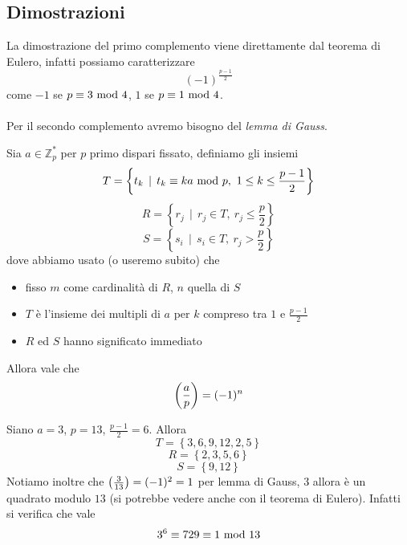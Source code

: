 \subsection{Dimostrazioni}
\begin{osservazione}
	La dimostrazione del primo complemento viene direttamente dal teorema di Eulero, infatti possiamo caratterizzare 
	\begin{equation*}
	(-1)^{\frac{p-1}{2}}
	\end{equation*}
	come $-1$ se $p\equiv3\ \mathrm{mod}\ 4$, $1$ se $p\equiv1\ \mathrm{mod}\ 4$. \\ \\ Per il secondo complemento avremo bisogno del \textit{lemma di Gauss}.
\end{osservazione}
\begin{teorema}
	Sia $a\in\mathbb{Z}_p^*$ per $p$ primo dispari fissato, definiamo gli insiemi
	\begin{equation*}
	T=\left\{t_k\,\mid\,t_k\equiv ka\ \mathrm{mod}\ p, \ 1\leq k\leq \frac{p-1}{2}\right\}
	\end{equation*}
	\begin{equation*}
	R=\left\{r_j\,\mid\,r_j\in T, \ r_j\leq \frac{p}{2}\right\}
	\end{equation*}
	\begin{equation*}
	S=\left\{s_i\,\mid\,s_i\in T, \ r_j> \frac{p}{2}\right\}
	\end{equation*}
	dove abbiamo usato (o useremo subito) che
	\begin{itemize}
		\item fisso $m$ come cardinalità di $R$, $n$ quella di $S$ 
		\item $T$ è l'insieme dei multipli di $a$ per $k$ compreso tra $1$ e $\frac{p-1}{2}$
		\item $R$ ed $S$ hanno significato immediato
	\end{itemize}
	Allora vale che 
	\begin{equation*}
	\left(\frac{a}{p}\right)=(-1)^n
	\end{equation*}
\end{teorema}
\begin{esempio}
	Siano $a=3$, $p=13$, $\frac{p-1}{2}=6$. Allora
	\begin{equation*}
	T=\left\{3,6,9,12,2,5\right\}
	\end{equation*}
	\begin{equation*}
	R=\left\{2,3,5,6\right\}
	\end{equation*}
	\begin{equation*}
	S=\left\{9,12\right\}
	\end{equation*}
	Notiamo inoltre che $\left(\frac{3}{13}\right)=(-1)^2=1$ per lemma di Gauss, $3$ allora è un quadrato modulo $13$ (si potrebbe vedere anche con il teorema di Eulero). Infatti si verifica che vale
	\begin{equation*}
	3^6\equiv729\equiv1\ \mathrm{mod}\ 13
	\end{equation*}
\end{esempio}
